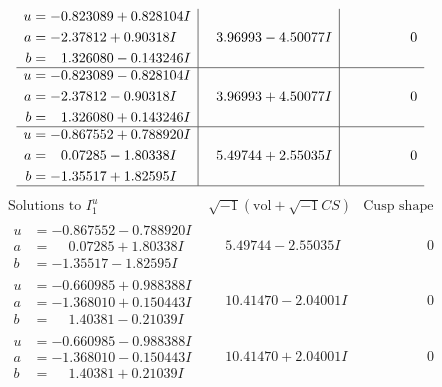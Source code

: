 \documentclass[1p]{elsarticle_modified}
\theoremstyle{definition}
\newcommand{\I}{\sqrt{-1}}
\begin{document}
$$\begin{array}{c|c|c}
\begin{aligned}
u &= -0.823089 + 0.828104 I \\
a &= -2.37812 + 0.90318 I \\
b &= \phantom{-}1.326080 - 0.143246 I\end{aligned}
 & \phantom{-}3.96993 - 4.50077 I & \phantom{-0.000000 } 0 \\ \hline\begin{aligned}
u &= -0.823089 - 0.828104 I \\
a &= -2.37812 - 0.90318 I \\
b &= \phantom{-}1.326080 + 0.143246 I\end{aligned}
 & \phantom{-}3.96993 + 4.50077 I & \phantom{-0.000000 } 0 \\ \hline\begin{aligned}
u &= -0.867552 + 0.788920 I \\
a &= \phantom{-}0.07285 - 1.80338 I \\
b &= -1.35517 + 1.82595 I\end{aligned}
 & \phantom{-}5.49744 + 2.55035 I & \phantom{-0.000000 } 0\\
 \hline 
 \end{array}$$\newpage$$\begin{array}{c|c|c}  
\text{Solutions to }I^u_{1}& \I (\text{vol} + \sqrt{-1}CS) & \text{Cusp shape}\\
 \hline 
\begin{aligned}
u &= -0.867552 - 0.788920 I \\
a &= \phantom{-}0.07285 + 1.80338 I \\
b &= -1.35517 - 1.82595 I\end{aligned}
 & \phantom{-}5.49744 - 2.55035 I & \phantom{-0.000000 } 0 \\ \hline\begin{aligned}
u &= -0.660985 + 0.988388 I \\
a &= -1.368010 + 0.150443 I \\
b &= \phantom{-}1.40381 - 0.21039 I\end{aligned}
 & \phantom{-}10.41470 - 2.04001 I & \phantom{-0.000000 } 0 \\ \hline\begin{aligned}
u &= -0.660985 - 0.988388 I \\
a &= -1.368010 - 0.150443 I \\
b &= \phantom{-}1.40381 + 0.21039 I\end{aligned}
 & \phantom{-}10.41470 + 2.04001 I & \phantom{-0.000000 } 0 \\ \hline\begin{aligned}

\end{aligned}
\end{array}$$
\end{document}
